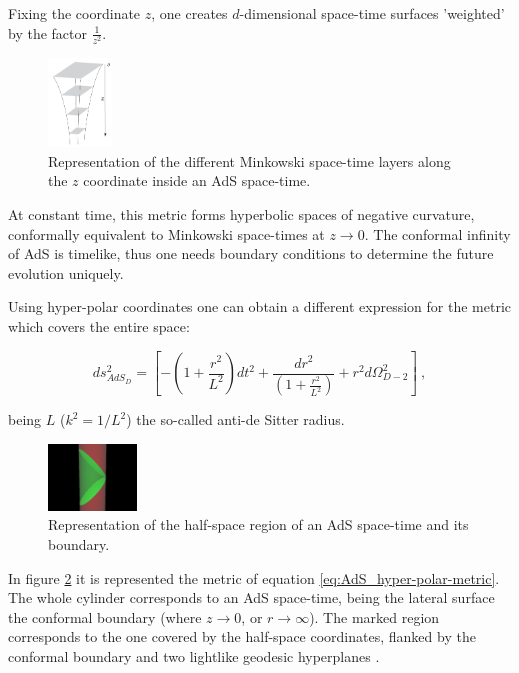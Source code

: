 \documentclass[lettersize,journal]{IEEEtran}
\providecommand{\eq}[2]{
    \begin{equation}
        #2
    \label{eq:#1}
    \end{equation}
}
\begin{document}
Fixing the coordinate $z$, one creates $d$-dimensional space-time surfaces 'weighted' by the factor $\frac{1}{z^2}$.

\begin{figure}
    \centering
    \includegraphics[width=0.15\textwidth]{../Imatges/Extern/Captura_Superficies_z.png}
\caption{Representation of the different Minkowski space-time layers along the $z$ coordinate inside an AdS space-time.}
\label{fig:AdS_z-surfaces}
\end{figure}

At constant time, \cite{} this metric forms hyperbolic spaces of negative curvature, conformally equivalent to Minkowski space-times at $z \to 0$. The conformal infinity of AdS is timelike, thus one needs boundary conditions to determine the future evolution uniquely.

Using hyper-polar coordinates one can obtain a different expression for the metric which covers the entire space:
\eq{AdS_hyper-polar-metric}{
    ds_{AdS_D}^2 = \left [ - \left ( 1 + \frac{r^2}{L^2} \right ) dt^2 + \frac{dr^2}{\left ( 1+ \frac{r^2}{L^2} \right )} + r^2 d \Omega_{D-2}^2 \right ] \ ,
}
being $L$ ($k^2=1/L^2$) the so-called anti-de Sitter radius.

\begin{figure}
    \centering
    \includegraphics[width=0.21\textwidth]{../Imatges/Extern/Wikipedia_Half-space_Cilindric.png}
\caption{Representation of the half-space region of an AdS space-time and its boundary.}
\label{fig:AdS_cylindrical}
\end{figure}

In figure \ref{fig:AdS_cylindrical} it is represented the metric of equation \ref{eq:AdS_hyper-polar-metric}. The whole cylinder corresponds to an AdS space-time, being the lateral surface the conformal boundary (where $z \to 0$, or $r \to \infty$). The marked region corresponds to the one covered by the half-space coordinates, flanked by the conformal boundary and two lightlike geodesic hyperplanes \cite{}.
\end{document}

